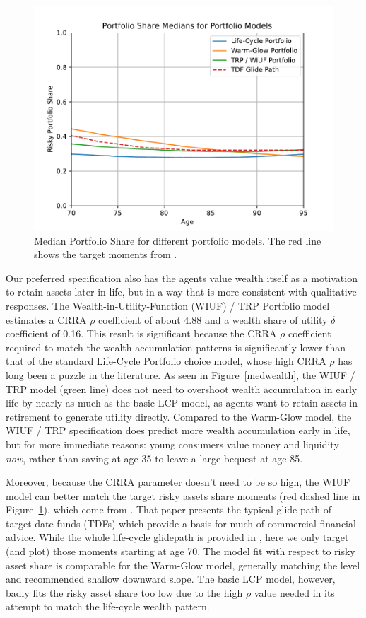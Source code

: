 \documentclass{article}
\newcommand{\CRRA}{\rho}
\begin{document}
\begin{figure}[!htbp]
\centering
\includegraphics[width=0.7\linewidth]{files/median_share-375a692fb3207501be3ba379fe1a09eb.pdf}
\caption[]{Median Portfolio Share for different portfolio models. The red line shows the target moments from \cite{Aboagye2024}.}
\label{medshare}
\end{figure}

Our preferred specification also has the agents value wealth itself as a motivation to retain assets later in life, but in a way that is more consistent with qualitative responses.
The Wealth-in-Utility-Function (WIUF) / TRP Portfolio model estimates a CRRA $\CRRA$ coefficient of about 4.88 and a wealth share of utility $\delta$ coefficient of 0.16.
This result is significant because the CRRA $\CRRA$ coefficient required to match the wealth accumulation patterns is significantly lower than that of the standard Life-Cycle Portfolio choice model, whose high CRRA $\CRRA$ has long been a puzzle in the literature.
As seen in Figure~\ref{medwealth}, the WIUF / TRP model (green line) does not need to overshoot wealth accumulation in early life by nearly as much as the basic LCP model, as agents want to retain assets in retirement to generate utility directly.
Compared to the Warm-Glow model, the WIUF / TRP specification does predict more wealth accumulation early in life, but for more immediate reasons: young consumers value money and liquidity \textit{now}, rather than saving at age 35 to leave a large bequest at age 85.

Moreover, because the CRRA parameter doesn't need to be so high, the WIUF model can better match the target risky assets share moments (red dashed line in Figure~\ref{medshare}), which come from \cite{Aboagye2024}.
That paper presents the typical glide-path of target-date funds (TDFs) which provide a basis for much of commercial financial advice.
While the whole life-cycle glidepath is provided in \cite{Aboagye2024}, here we only target (and plot) those moments starting at age 70.
The model fit with respect to risky asset share is comparable for the Warm-Glow model, generally matching the level and recommended shallow downward slope.
The basic LCP model, however, badly fits the risky asset share too low due to the high $\CRRA$ value needed in its attempt to match the life-cycle wealth pattern.
\end{document}
